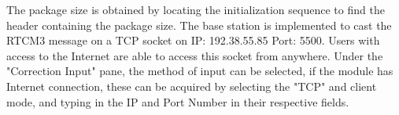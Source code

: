 The package size is obtained by locating the initialization sequence to find the header containing the package size. The base station is implemented to cast the RTCM3 message on a TCP socket on IP: 192.38.55.85 Port: 5500. Users with access to the Internet are able to access this socket from anywhere. Under the "Correction Input" pane, the method of input can be selected, if the module has Internet connection, these can be acquired by selecting the "TCP" and client mode, and typing in the IP and Port Number in their respective fields.




